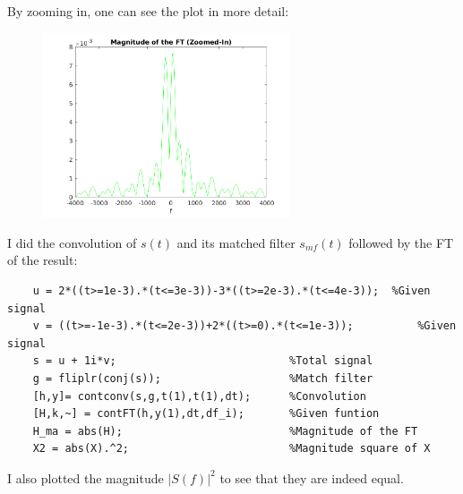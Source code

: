 \documentclass[a4paper,11pt]{article}
\begin{document}
By zooming in, one can see the plot in more detail:

\begin{figure}[!hp]
    \begin{center}
      \includegraphics[width=0.65\textwidth]{images/exercice_5a_c.png}
    \end{center}
\end{figure}

\newpage

I did the convolution of $s(t)$ and its matched filter $s_{mf}(t)$ followed by the FT of the result:

\bigskip

\begin{lstlisting}
    u = 2*((t>=1e-3).*(t<=3e-3))-3*((t>=2e-3).*(t<=4e-3));	%Given signal
    v = ((t>=-1e-3).*(t<=2e-3))+2*((t>=0).*(t<=1e-3));          %Given signal
    s = u + 1i*v;                           %Total signal
    g = fliplr(conj(s));                    %Match filter
    [h,y]= contconv(s,g,t(1),t(1),dt);      %Convolution
    [H,k,~] = contFT(h,y(1),dt,df_i);       %Given funtion
    H_ma = abs(H);                          %Magnitude of the FT
    X2 = abs(X).^2;                         %Magnitude square of X
\end{lstlisting}

\bigskip

I also plotted the magnitude $|S(f)|^2$ to see that they are indeed equal.
\end{document}
